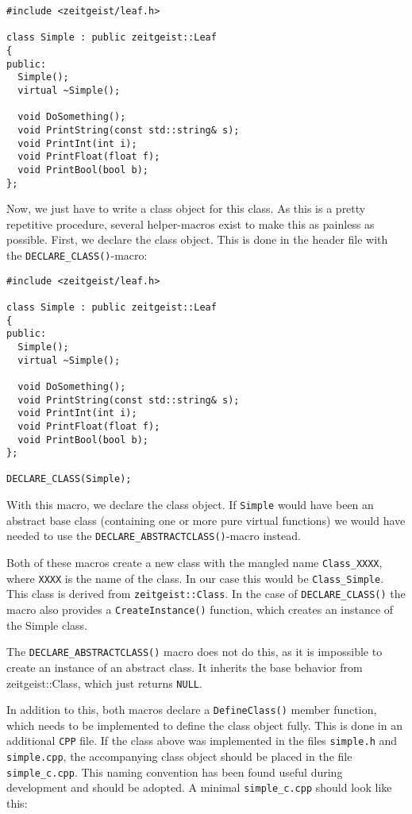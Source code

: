 \begin{verbatim}
#include <zeitgeist/leaf.h>

class Simple : public zeitgeist::Leaf
{
public:
  Simple();
  virtual ~Simple();
  
  void DoSomething();
  void PrintString(const std::string& s);
  void PrintInt(int i);
  void PrintFloat(float f);
  void PrintBool(bool b);
};
\end{verbatim}

Now, we just have to write a class object for this class. As this is a
pretty repetitive procedure, several helper-macros exist to make this
as painless as possible. First, we declare the class object. This is
done in the header file with the \texttt{DECLARE\_CLASS()}-macro:

\begin{verbatim}
#include <zeitgeist/leaf.h>

class Simple : public zeitgeist::Leaf
{
public:
  Simple();
  virtual ~Simple();
  
  void DoSomething();
  void PrintString(const std::string& s);
  void PrintInt(int i);
  void PrintFloat(float f);
  void PrintBool(bool b);
};

DECLARE_CLASS(Simple);
\end{verbatim}

With this macro, we declare the class object. If \texttt{Simple} would
have been an abstract base class (containing one or more pure virtual
functions) we would have needed to use the
\texttt{DECLARE\_ABSTRACTCLASS()}-macro instead. 

Both of these macros create a new class with the mangled name
\texttt{Class\_XXXX}, where \texttt{XXXX} is the name of the class. 
In our case this would be \texttt{Class\_Simple}. This class is derived
from \texttt{zeitgeist::Class}. In the case of
\texttt{DECLARE\_CLASS()} the macro also provides a \texttt{CreateInstance()}
function, which creates an instance of the Simple class. 

The \texttt{DECLARE\_ABSTRACTCLASS()} macro does not do this, as it is
impossible to create an instance of an abstract class. It inherits the
base behavior from zeitgeist::Class, which just returns
\texttt{NULL}. 

In addition to this, both macros declare a \texttt{DefineClass()}
member function, which needs to be implemented to define the class
object fully. This is done in an additional \texttt{CPP} file. If the
class above was implemented in the files \texttt{simple.h} and
\texttt{simple.cpp}, the accompanying class object should be placed in
the file \texttt{simple\_c.cpp}. This naming convention has been found
useful during development and should be adopted. A minimal
\texttt{simple\_c.cpp} should look like this:

